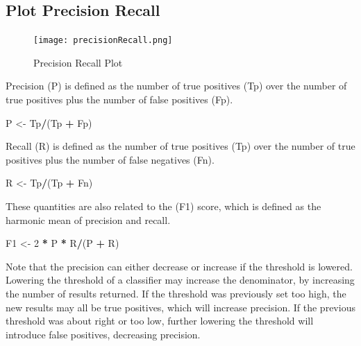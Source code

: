 \documentclass[]{article}
\newenvironment{Shaded}{\begin{snugshade}}{\end{snugshade}}
\newcommand{\DecValTok}[1]{\textcolor[rgb]{0.00,0.00,0.81}{#1}}
\newcommand{\StringTok}[1]{\textcolor[rgb]{0.31,0.60,0.02}{#1}}
\newcommand{\OperatorTok}[1]{\textcolor[rgb]{0.81,0.36,0.00}{\textbf{#1}}}
\newcommand{\NormalTok}[1]{#1}
\begin{document}
\newpage

\subsection{Plot Precision Recall}\label{plot-precision-recall}

\begin{figure}
\centering
\texttt{[image: precisionRecall.png]}
\caption{Precision Recall Plot}
\end{figure}

Precision (P) is defined as the number of true positives (Tp) over the
number of true positives plus the number of false positives (Fp).

\begin{Shaded}
\begin{Highlighting}[]
\NormalTok{P <-}\StringTok{ }\NormalTok{Tp}\OperatorTok{/}\NormalTok{(Tp }\OperatorTok{+}\StringTok{ }\NormalTok{Fp)}
\end{Highlighting}
\end{Shaded}

Recall (R) is defined as the number of true positives (Tp) over the
number of true positives plus the number of false negatives (Fn).

\begin{Shaded}
\begin{Highlighting}[]
\NormalTok{R <-}\StringTok{ }\NormalTok{Tp}\OperatorTok{/}\NormalTok{(Tp }\OperatorTok{+}\StringTok{ }\NormalTok{Fn)}
\end{Highlighting}
\end{Shaded}

These quantities are also related to the (F1) score, which is defined as
the harmonic mean of precision and recall.

\begin{Shaded}
\begin{Highlighting}[]
\NormalTok{F1 <-}\StringTok{ }\DecValTok{2} \OperatorTok{*}\StringTok{ }\NormalTok{P }\OperatorTok{*}\StringTok{ }\NormalTok{R}\OperatorTok{/}\NormalTok{(P }\OperatorTok{+}\StringTok{ }\NormalTok{R)}
\end{Highlighting}
\end{Shaded}

Note that the precision can either decrease or increase if the threshold
is lowered. Lowering the threshold of a classifier may increase the
denominator, by increasing the number of results returned. If the
threshold was previously set too high, the new results may all be true
positives, which will increase precision. If the previous threshold was
about right or too low, further lowering the threshold will introduce
false positives, decreasing precision.
\end{document}
